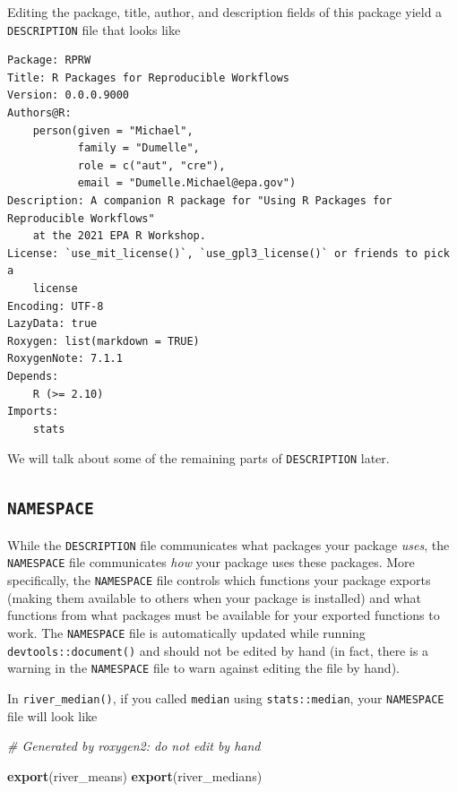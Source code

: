 \documentclass[
]{book}
\newenvironment{Shaded}{\begin{snugshade}}{\end{snugshade}}
\newcommand{\CommentTok}[1]{\textcolor[rgb]{0.56,0.35,0.01}{\textit{#1}}}
\newcommand{\KeywordTok}[1]{\textcolor[rgb]{0.13,0.29,0.53}{\textbf{#1}}}
\newcommand{\NormalTok}[1]{#1}
\begin{document}
Editing the package, title, author, and description fields of this package yield a \texttt{DESCRIPTION} file that looks like

\begin{verbatim}
Package: RPRW
Title: R Packages for Reproducible Workflows
Version: 0.0.0.9000
Authors@R: 
    person(given = "Michael",
           family = "Dumelle",
           role = c("aut", "cre"),
           email = "Dumelle.Michael@epa.gov")
Description: A companion R package for "Using R Packages for Reproducible Workflows"
    at the 2021 EPA R Workshop.
License: `use_mit_license()`, `use_gpl3_license()` or friends to pick a
    license
Encoding: UTF-8
LazyData: true
Roxygen: list(markdown = TRUE)
RoxygenNote: 7.1.1
Depends: 
    R (>= 2.10)
Imports: 
    stats
\end{verbatim}

We will talk about some of the remaining parts of \texttt{DESCRIPTION} later.

\hypertarget{namespace}{%
\subsection{\texorpdfstring{\texttt{NAMESPACE}}{NAMESPACE}}\label{namespace}}

While the \texttt{DESCRIPTION} file communicates what packages your package \emph{uses}, the \texttt{NAMESPACE} file communicates \emph{how} your package uses these packages. More specifically, the \texttt{NAMESPACE} file controls which functions your package exports (making them available to others when your package is installed) and what functions from what packages must be available for your exported functions to work. The \texttt{NAMESPACE} file is automatically updated while running \texttt{devtools::document()} and should not be edited by hand (in fact, there is a warning in the \texttt{NAMESPACE} file to warn against editing the file by hand).

In \texttt{river\_median()}, if you called \texttt{median} using \texttt{stats::median}, your \texttt{NAMESPACE} file will look like

\begin{Shaded}
\begin{Highlighting}[]
\CommentTok{# Generated by roxygen2: do not edit by hand}

\KeywordTok{export}\NormalTok{(river_means)}
\KeywordTok{export}\NormalTok{(river_medians)}
\end{Highlighting}
\end{Shaded}
\end{document}
